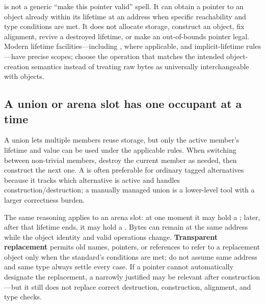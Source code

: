  is not a generic ``make this pointer valid'' spell. It can obtain a pointer to an object already within its lifetime at an address when specific reachability and type conditions are met. It does not allocate storage, construct an object, fix alignment, revive a destroyed lifetime, or make an out-of-bounds pointer legal. Modern lifetime facilities---including ,  where applicable, and implicit-lifetime rules---have precise scopes; choose the operation that matches the intended object-creation semantics instead of treating raw bytes as universally interchangeable with objects.

\subsection{A union or arena slot has one occupant at a time}\label{01-foundations-i-ch004-a-union-or-arena-slot-has-one-occupant-at-a-time}

\hypertarget{01-foundations-i-ch004-a-union-or-arena-slot-has-one-occupant-at-a-time}{}

A union lets multiple members reuse storage, but only the active member's lifetime and value can be used under the applicable rules. When switching between non-trivial members, destroy the current member as needed, then construct the next one. A  is often preferable for ordinary tagged alternatives because it tracks which alternative is active and handles construction/destruction; a manually managed union is a lower-level tool with a larger correctness burden.

The same reasoning applies to an arena slot: at one moment it may hold a ; later, after that lifetime ends, it may hold a . Bytes can remain at the same address while the object identity and valid operations change. \textbf{Transparent replacement} permits old names, pointers, or references to refer to a replacement object only when the standard's conditions are met; do not assume same address and same type always settle every case. If a pointer cannot automatically designate the replacement, a narrowly justified  may be relevant after construction---but it still does not replace correct destruction, construction, alignment, and type checks.

